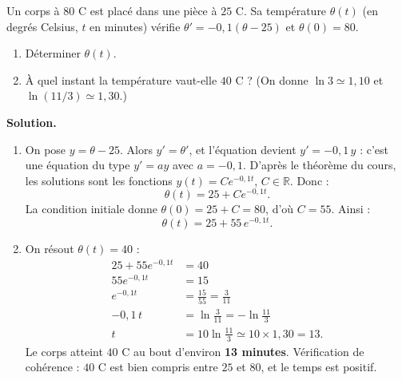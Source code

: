 \documentclass[11pt]{article}
\begin{document}
\begin{exoresolu}
Un corps à $80$ \textdegree C est placé dans une pièce à $25$ \textdegree C. Sa température $\theta(t)$ (en degrés Celsius, $t$ en minutes) vérifie $\theta'=-0{,}1(\theta-25)$ et $\theta(0)=80$.
\begin{enumerate}
\item Déterminer $\theta(t)$.
\item À quel instant la température vaut-elle $40$ \textdegree C ? (On donne $\ln 3\simeq 1{,}10$ et $\ln(11/3)\simeq 1{,}30$.)
\end{enumerate}
\tcblower
\textbf{Solution.}
\begin{enumerate}
\item On pose $y=\theta-25$. Alors $y'=\theta'$, et l'équation devient $y'=-0{,}1\,y$ : c'est une équation du type $y'=ay$ avec $a=-0{,}1$. D'après le théorème du cours, les solutions sont les fonctions $y(t)=Ce^{-0{,}1t}$, $C\in\mathbb{R}$. Donc :
\[ \theta(t)=25+Ce^{-0{,}1t}. \]
La condition initiale donne $\theta(0)=25+C=80$, d'où $C=55$. Ainsi :
\[ \boxed{\theta(t)=25+55\,e^{-0{,}1t}}. \]
\item On résout $\theta(t)=40$ :
\begin{align*}
25+55e^{-0{,}1t}&=40\\
55e^{-0{,}1t}&=15\\
e^{-0{,}1t}&=\frac{15}{55}=\frac{3}{11}\\
-0{,}1\,t&=\ln\frac{3}{11}=-\ln\frac{11}{3}\\
t&=10\ln\frac{11}{3}\simeq 10\times 1{,}30=13.
\end{align*}
Le corps atteint $40$ \textdegree C au bout d'environ \textbf{13 minutes}. Vérification de cohérence : $40$ \textdegree C est bien compris entre $25$ et $80$, et le temps est positif.
\end{enumerate}
\end{exoresolu}
\end{document}
